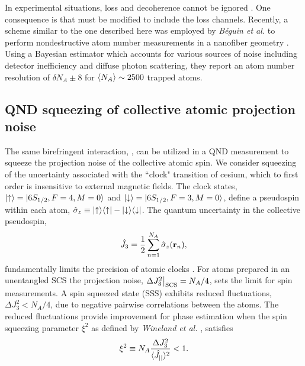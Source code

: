 \documentclass[preprint,aps,pra,onecolumn]{revtex4-1} %
\newcommand{\scs}{{\rm SCS}}
\begin{document}
In experimental situations, loss and decoherence cannot be ignored \cite{dawkins_dispersive_2011, zhang_collective_2012}. One consequence is that  must be modified to include the loss channels. Recently, a scheme similar to the one described here was employed by \emph{B\'{e}guin et al.} to perform nondestructive atom number measurements in a nanofiber geometry \cite{beguin_generation_2014}.  Using a Bayesian estimator which accounts for various sources of noise including detector inefficiency and diffuse photon scattering, they report an atom number resolution of $\delta N_A \pm 8$ for $\langle{N_A}\rangle\sim2500$ trapped atoms.  


	\subsection{QND squeezing of collective atomic projection noise}

The same birefringent interaction, , can be utilized in a QND measurement to squeeze the projection noise of the collective atomic spin.  We consider squeezing of the uncertainty associated with the ``clock" transition of cesium, which to first order is insensitive to external magnetic fields.  The clock states, $\lvert{\uparrow}\rangle = \lvert{6S_{1/2}, F=4, M=0}\rangle$ and $\lvert{\downarrow}\rangle = \lvert{6S_{1/2}, F=3, M=0}\rangle$, define a pseudospin within each atom, $\hat{\sigma}_z \equiv \lvert{\uparrow}\rangle\langle{\uparrow}\rvert - \lvert{\downarrow}\rangle\langle{\downarrow}\rvert$.  The quantum uncertainty in the collective pseudospin,
	\begin{align}
		\hat{J}_3 = \frac{1}{2} \sum_{n=1}^{N_A} \hat{\sigma}_z(\mathbf{r}_n),  
	\end{align}
fundamentally limits the precision of atomic clocks \cite{wineland_spin_1992}. For atoms prepared in an unentangled SCS the projection noise, $\Delta J_3^2 \big|_{\scs} = N_A/4$, sets the limit for spin measurements. A spin squeezed state (SSS) exhibits reduced fluctuations, $ \Delta J_3^2  < N_A/4$, due to  negative pairwise correlations between the atoms. The reduced fluctuations provide improvement for phase estimation when the spin squeezing parameter $\xi^2$ as defined by \emph{Wineland et al.} \cite{wineland_spin_1992}, satisfies
	\begin{align}
		\xi^2 \equiv N_A \frac{ \Delta J_3^2 }{ \langle{\hat{J}_{||}}\rangle^2 } < 1.
	\end{align}
	
\end{document}
